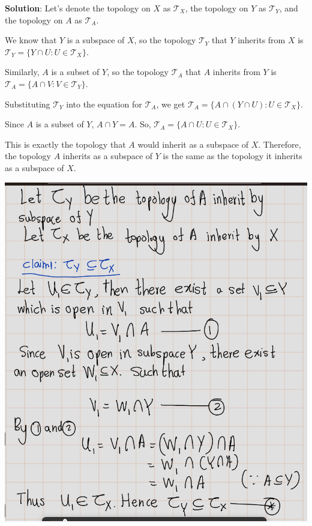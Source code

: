 \documentclass[
]{book}
\theoremstyle{definition}
\theoremstyle{definition}
\theoremstyle{definition}
\theoremstyle{definition}
\theoremstyle{remark}
\begin{document}
\textbf{Solution}:
Let's denote the topology on \(X\) as \(\mathcal{T}_X\), the topology on \(Y\) as \(\mathcal{T}_Y\), and the topology on \(A\) as \(\mathcal{T}_A\).

We know that \(Y\) is a subspace of \(X\), so the topology \(\mathcal{T}_Y\) that \(Y\) inherits from \(X\) is \(\mathcal{T}_Y = \{ Y \cap U : U \in \mathcal{T}_X \}\).

Similarly, \(A\) is a subset of \(Y\), so the topology \(\mathcal{T}_A\) that \(A\) inherits from \(Y\) is \(\mathcal{T}_A = \{ A \cap V : V \in \mathcal{T}_Y \}\).

Substituting \(\mathcal{T}_Y\) into the equation for \(\mathcal{T}_A\), we get \(\mathcal{T}_A = \{ A \cap (Y \cap U) : U \in \mathcal{T}_X \}\).

Since \(A\) is a subset of \(Y\), \(A \cap Y = A\). So, \(\mathcal{T}_A = \{ A \cap U : U \in \mathcal{T}_X \}\).

This is exactly the topology that \(A\) would inherit as a subspace of \(X\). Therefore, the topology \(A\) inherits as a subspace of \(Y\) is the same as the topology it inherits as a subspace of \(X\).

\includegraphics{figures/Exercises/Ex 2.16/ex1-1.png}
\end{document}
